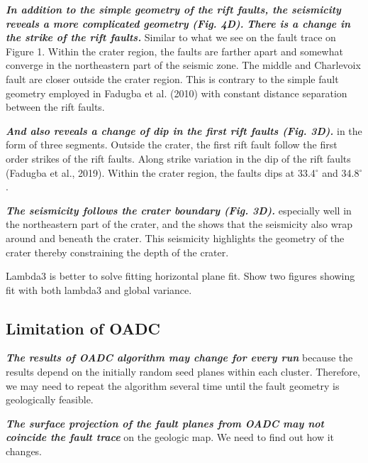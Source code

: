 \documentclass[draft]{agujournal2018}
\begin{document}
\textit{\textbf{In addition to the simple geometry of the rift faults, the seismicity reveals a more complicated geometry (Fig. 4D).}} \textit{\textbf{There is a change in the strike of the rift faults.}} Similar to what we see on the fault trace on Figure 1. Within the crater region, the faults are farther apart and somewhat converge in the northeastern part of the seismic zone. The middle and Charlevoix fault are closer outside the crater region. This is contrary to the simple fault geometry employed in Fadugba et al. (2010) with constant distance separation between the rift faults.

\textit{\textbf{And also reveals a change of dip in the first rift faults (Fig. 3D).}} in the form of three segments. Outside the crater, the first rift fault follow the first order strikes of the rift faults. Along strike variation in the dip of the rift faults (Fadugba et al., 2019). Within the crater region, the faults dips at 33.4$^\circ$ and 34.8$^\circ$.

\textit{\textbf{The seismicity follows the crater boundary (Fig. 3D).}} especially well in the northeastern part of the crater, and the shows that the seismicity also wrap around and beneath the crater. This seismicity highlights the geometry of the crater thereby constraining the depth of the crater. 


Lambda3 is better to solve fitting horizontal plane fit.
Show two figures showing fit with both lambda3 and global variance.





\subsection{Limitation of OADC}
\textit{\textbf{The results of OADC algorithm may change for every run}} because the results depend on the initially random seed planes within each cluster. Therefore, we may need to repeat the algorithm several time until the fault geometry is geologically feasible. 

\textit{\textbf{The surface projection of the fault planes from OADC may not coincide the fault trace}} on the geologic map. We need to find out how it changes.
\end{document}
